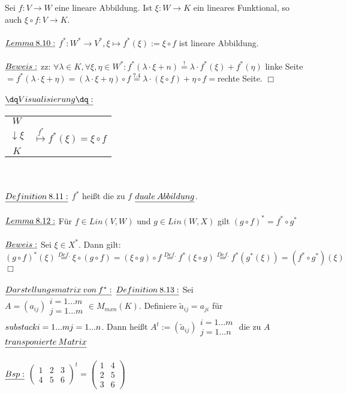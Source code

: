 \documentclass[fleqn, a4paper, 11pt]{scrartcl}
\theoremstyle{definition}
\begin{document}
Sei $f:V\rightarrow W$ eine lineare Abbildung. Ist $\xi:W\rightarrow K$ ein lineares Funktional, so auch $\xi\circ f:V\rightarrow K$.\\
\\
$\uline{Lemma\:8.10:}$ $f^{\ast}:W^{\ast}\rightarrow V^{\ast},\xi\mapsto f^{\ast}(\xi):=\xi\circ f$ ist lineare Abbildung.\\
\\
$\uline{Beweis:}$ zz: $\forall\lambda\in K,\forall\xi,\eta\in W^{\ast}:f^{\ast}(\lambda\cdot\xi + n)\stackrel{!}{=}\lambda\cdot f^{\ast}(\xi)+f^{\ast}(\eta)$
linke Seite$=f^{\ast}(\lambda\cdot\xi +\eta)=(\lambda\cdot\xi +\eta)\circ f\stackrel{7.4}{=}\lambda\cdot(\xi\circ f)+\eta\circ f=$rechte Seite. \hfill $\Box$\\
\\
$\uline{\dq Visualisierung\dq:}$ \begin{tabular}{cc}
	$W$ & \\
	$\downarrow\xi$ & $\stackrel{f^{\ast}}{\mapsto}f^{\ast}(\xi)=\xi\circ f$\\
	$K$ & 
\end{tabular}\\
\\
$\uline{Definition\:8.11:}$ $f^{\ast}$ heißt die zu $f$ $\uline{duale\:Abbildung}$.\\
\\
$\uline{Lemma\:8.12:}$ Für $f\in Lin(V,W)$ und $g\in Lin(W,X)$ gilt $(g\circ f)^{\ast}=f^{\ast}\circ g^{\ast}$\\
\\
$\uline{Beweis:}$ Sei $\xi\in X^{\ast}$. Dann gilt: $(g\circ f)^{\ast}(\xi)\stackrel{Def.}{=}\xi\circ(g\circ f)=(\xi\circ g)\circ f\stackrel{Def.}{=}f^{\ast}(\xi\circ g)\stackrel{Def.}{=}f^{\ast}(g^{\ast}(\xi))=(f^{\ast}\circ g^{\ast})(\xi)$ \hfill $\Box$\\
\\
$\uline{Darstellungsmatrix\:von\:f^{\ast}:}$ $\uline{Definition\:8.13:}$ Sei $A=(a_{ij})\substack{i=1...m\\j=1...m}\in M_{mxn}(K)$. Definiere $\tilde{a}_{ij}=a_{ji}$ für $substack{i=1...m\\j=1...n}$. Dann heißt $A^t:=(\tilde{a}_{ij})\substack{i=1...m\\j=1...n}$ die zu $A$ $\uline{transponierte\:Matrix}$\\
\\
$\uline{Bsp:}$ $\begin{pmatrix}
	1 & 2 & 3\\
	4 & 5 & 6 
\end{pmatrix}^t=\begin{pmatrix}
	1 & 4\\
	2 & 5\\
	3 & 6
\end{pmatrix}$\\
\end{document}
